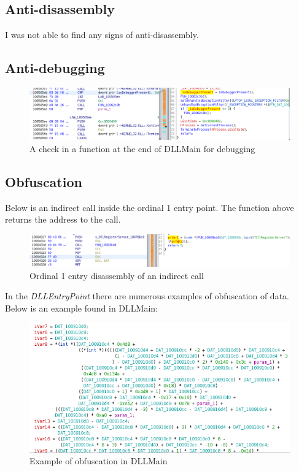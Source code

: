\documentclass{article}
\begin{document}
    \subsection{Anti-disassembly}
    I was not able to find any signs of anti-disassembly.
    \subsection{Anti-debugging}
    \begin{figure}[H]
        \includegraphics[width=\textwidth]{antidebuging.png}
        \caption{A check in a function at the end of DLLMain for debugging}
    \end{figure}
    \subsection{Obfuscation}
    Below is an indirect call inside the ordinal 1 entry point. The function above returns the address to the call.
    \begin{figure}[H]
        \includegraphics[width=\textwidth]{ord1obf.png}
        \caption{Ordinal 1 entry disassembly of an indirect call}
    \end{figure}
    In the \textit{DLLEntryPoint} there are numerous examples of obfuscation of data. Below is an example found in DLLMain:
    \begin{figure}[H]
        \includegraphics[width=\textwidth]{obfex.png}
        \caption{Example of obfuscation in DLLMain}
    \end{figure}
    \pagebreak
\end{document}
